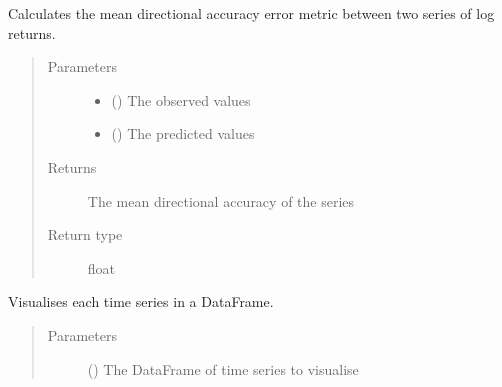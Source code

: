 \documentclass[letterpaper,10pt,english]{sphinxmanual}
\begin{document}
\begin{fulllineitems}
\label{\detokenize{eval_inspect:Foresight.eval_inspect.mean_directional_accuracy_log_ret}}
Calculates the mean directional accuracy error metric between
two series of log returns.
\begin{quote}\begin{description}
\item[{Parameters}] \leavevmode\begin{itemize}
\item {} 
 () \textendash{} The observed values

\item {} 
 () \textendash{} The predicted values

\end{itemize}

\item[{Returns}] \leavevmode
The mean directional accuracy of the series

\item[{Return type}] \leavevmode
float

\end{description}\end{quote}

\end{fulllineitems}


\begin{fulllineitems}
\label{\detokenize{eval_inspect:Foresight.eval_inspect.visualise_df}}
Visualises each time series in a DataFrame.
\begin{quote}\begin{description}
\item[{Parameters}] \leavevmode
{} () \textendash{} The DataFrame of time series to visualise

\end{description}\end{quote}

\end{fulllineitems}
\end{document}

